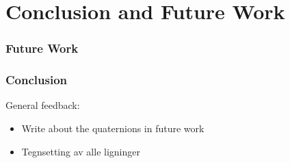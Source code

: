 \chapter{Conclusion and Future Work}

\subsection{Future Work}

\subsection{Conclusion}

{\color{red}
General feedback:
\begin{itemize}
    \item Write about the quaternions in future work
    \item Tegnsetting av alle ligninger
\end{itemize}
}
